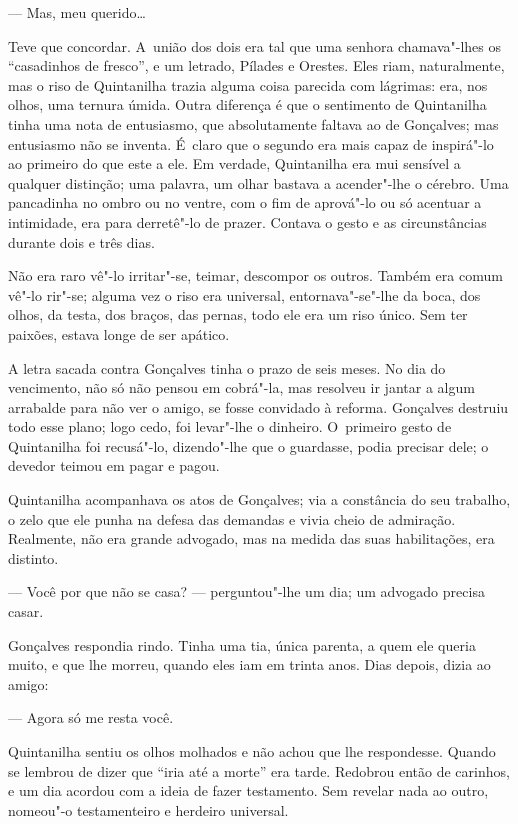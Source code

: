 \begin{linenumbers}
--- Mas, meu querido\ldots{}

Teve que concordar. A~união dos dois era tal que uma senhora
chamava"-lhes os ``casadinhos de fresco'', e um letrado, Pílades e
Orestes. Eles riam, naturalmente, mas o riso de Quintanilha trazia
alguma coisa parecida com lágrimas: era, nos olhos, uma ternura úmida.
Outra diferença é que o sentimento de Quintanilha tinha uma nota de
entusiasmo, que absolutamente faltava ao de Gonçalves; mas entusiasmo
não se inventa. É~claro que o segundo era mais capaz de inspirá"-lo ao
primeiro do que este a ele. Em verdade, Quintanilha era mui sensível a
qualquer distinção; uma palavra, um olhar bastava a acender"-lhe o
cérebro. Uma pancadinha no ombro ou no ventre, com o fim de aprová"-lo ou
só acentuar a intimidade, era para derretê"-lo de prazer. Contava o gesto
e as circunstâncias durante dois e três dias.

Não era raro vê"-lo irritar"-se, teimar, descompor os outros. Também era
comum vê"-lo rir"-se; alguma vez o riso era universal, entornava"-se"-lhe da
boca, dos olhos, da testa, dos braços, das pernas, todo ele era um riso
único. Sem ter paixões, estava longe de ser apático.

A letra sacada contra Gonçalves tinha o prazo de seis meses. No dia do
vencimento, não só não pensou em cobrá"-la, mas resolveu ir jantar a
algum arrabalde para não ver o amigo, se fosse convidado à reforma.
Gonçalves destruiu todo esse plano; logo cedo, foi levar"-lhe o dinheiro.
O~primeiro gesto de Quintanilha foi recusá"-lo, dizendo"-lhe que o
guardasse, podia precisar dele; o devedor teimou em pagar e pagou.

Quintanilha acompanhava os atos de Gonçalves; via a constância do seu
trabalho, o zelo que ele punha na defesa das demandas e vivia cheio de
admiração. Realmente, não era grande advogado, mas na medida das suas
habilitações, era distinto.

--- Você por que não se casa? --- perguntou"-lhe um dia; um advogado
precisa casar.

Gonçalves respondia rindo. Tinha uma tia, única parenta, a quem ele
queria muito, e que lhe morreu, quando eles iam em trinta anos. Dias
depois, dizia ao amigo:

--- Agora só me resta você.

Quintanilha sentiu os olhos molhados e não achou que lhe respondesse.
Quando se lembrou de dizer que ``iria até a morte'' era tarde. Redobrou
então de carinhos, e um dia acordou com a ideia de fazer testamento. Sem
revelar nada ao outro, nomeou"-o testamenteiro e herdeiro universal.


\end{linenumbers}
